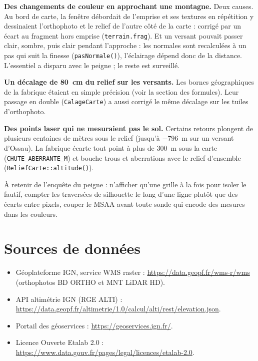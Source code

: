 \documentclass[a4paper,12pt]{article}
\newcommand{\code}[1]{\texttt{#1}}
\begin{document}
\textbf{Des changements de couleur en approchant une montagne.} Deux causes.
Au bord de carte, la fenêtre débordait de l'emprise et ses textures en
répétition y dessinaient l'orthophoto et le relief de l'autre côté de la
carte : corrigé par un écart au fragment hors emprise (\code{terrain.frag}).
Et un versant pouvait passer clair, sombre, puis clair pendant l'approche :
les normales sont recalculées à un pas qui suit la finesse
(\code{pasNormale()}), l'éclairage dépend donc de la distance. L'essentiel a
disparu avec le peigne ; le reste est surveillé.

\textbf{Un décalage de 80~cm du relief sur les versants.} Les bornes
géographiques de la fabrique étaient en simple précision (voir la section des
formules). Leur passage en double (\code{CalageCarte}) a aussi corrigé le
même décalage sur les tuiles d'orthophoto.

\textbf{Des points laser qui ne mesuraient pas le sol.} Certains retours
plongent de plusieurs centaines de mètres sous le relief (jusqu'à $-796$~m sur
un versant d'Ossau). La fabrique écarte tout point à plus de 300~m sous la
carte (\code{CHUTE\_ABERRANTE\_M}) et bouche trous et aberrations avec le
relief d'ensemble (\code{ReliefCarte::altitude()}).

À retenir de l'enquête du peigne : n'afficher qu'une grille à la fois pour
isoler le fautif, compter les traversées de silhouette le long d'une ligne
plutôt que des écarts entre pixels, couper le MSAA avant toute sonde qui
encode des mesures dans les couleurs.

\newpage

\section{Sources de données}

\begin{itemize}
  \item Géoplateforme IGN, service WMS raster :
    \url{https://data.geopf.fr/wms-r/wms} (orthophotos BD ORTHO et MNT LiDAR
    HD).
  \item API altimétrie IGN (RGE ALTI) :
    \url{https://data.geopf.fr/altimetrie/1.0/calcul/alti/rest/elevation.json}.
  \item Portail des géoservices : \url{https://geoservices.ign.fr/}.
  \item Licence Ouverte Etalab 2.0 :
    \url{https://www.data.gouv.fr/pages/legal/licences/etalab-2.0}.
\end{itemize}
\end{document}
